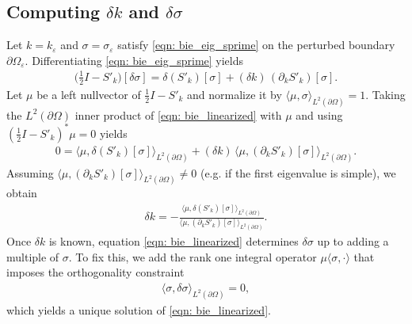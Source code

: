 \documentclass{amsart}
\theoremstyle{plain}
\begin{document}
\subsection{Computing $\delta k$ and $\delta\sigma$}
Let $k=k_\varepsilon$ and $\sigma=\sigma_\varepsilon$ satisfy \eqref{eqn: bie_eig_sprime} on the perturbed boundary $\partial \Omega_\varepsilon$.
Differentiating \eqref{eqn: bie_eig_sprime} yields
  \begin{align}\label{eqn: bie_linearized}
    \Big(\frac{1}{2} I - S'_k\Big)[\delta\sigma]
    = \delta(S'_k)[\sigma] + (\delta k)\,(\partial_k S'_k)[\sigma].
  \end{align}
Let $\mu$ be a left nullvector of $\frac{1}{2} I - S'_k$ and normalize it by $\langle \mu,\sigma\rangle_{L^2(\partial \Omega)}=1$.
Taking the $L^2(\partial \Omega)$ inner product of \eqref{eqn: bie_linearized} with $\mu$ and using $(\frac{1}{2} I - S'_k)^*\mu=0$ yields
  \begin{align}
    0
    = \big\langle \mu, \delta(S'_k)[\sigma]\big\rangle_{L^2(\partial \Omega)}
      + (\delta k)\,\big\langle \mu,(\partial_k S'_k)[\sigma]\big\rangle_{L^2(\partial \Omega)}.
  \end{align}
Assuming $\langle \mu,(\partial_k S'_k)[\sigma]\rangle_{L^2(\partial \Omega)}\neq 0$ (e.g. if the first eigenvalue is simple), we obtain
  \begin{align}\label{eqn: dk_formula}
    \delta k
    = -\frac{\langle \mu,\delta(S'_k)[\sigma]\rangle_{L^2(\partial \Omega)}}{\langle \mu,(\partial_k S'_k)[\sigma]\rangle_{L^2(\partial \Omega)}}.
  \end{align}
Once $\delta k$ is known, equation \eqref{eqn: bie_linearized} determines $\delta\sigma$ up to adding a multiple of $\sigma$.
To fix this, we add the rank one integral operator $\mu\langle\sigma,\cdot\rangle$ that imposes the orthogonality constraint
  \begin{align}\label{eqn: dsigma_orthog}
    \langle \sigma,\delta\sigma\rangle_{L^2(\partial \Omega)} = 0,
  \end{align}
which yields a unique solution of \eqref{eqn: bie_linearized}.
\end{document}
